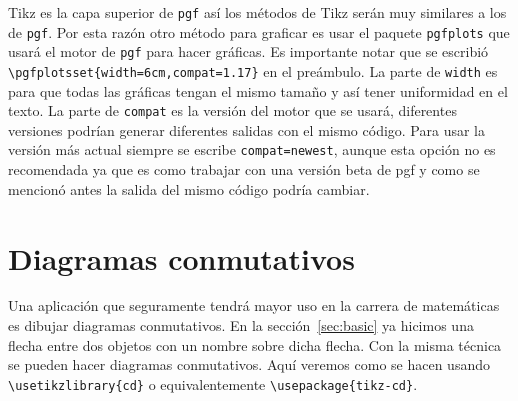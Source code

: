 Tikz es la capa superior de \texttt{pgf} así los métodos de Tikz serán muy
similares a los de \texttt{pgf}. Por esta razón otro método para graficar es
usar el paquete \texttt{pgfplots} que usará el motor de \texttt{pgf} para
hacer gráficas. Es importante notar que se escribió
\verb|\pgfplotsset{width=6cm,compat=1.17}| en el preámbulo. La parte de
\texttt{width} es para que todas las gráficas tengan el mismo tamaño y así
tener uniformidad en el texto. La parte de \texttt{compat} es la versión del
motor que se usará, diferentes versiones podrían generar diferentes salidas
con el mismo código. Para usar la versión más actual siempre se escribe
\texttt{compat=newest}, aunque esta opción no es recomendada ya que es como
trabajar con una versión beta de pgf y como se mencionó antes la salida del
mismo código podría cambiar.
\begin{center}
\end{center}


\section{Diagramas conmutativos}
Una aplicación que seguramente tendrá mayor uso en la carrera de matemáticas
es dibujar diagramas conmutativos. En la sección~\ref{sec:basic} ya hicimos
una flecha entre dos objetos con un nombre sobre dicha flecha. Con la misma
técnica se pueden hacer diagramas conmutativos. Aquí veremos como se
hacen usando \verb|\usetikzlibrary{cd}| o equivalentemente
\verb|\usepackage{tikz-cd}|.
\begin{center}
\end{center}

